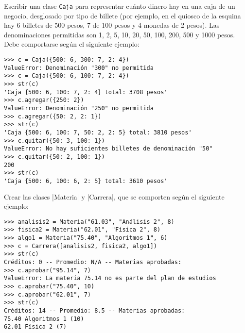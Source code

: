 \begin{ejercicio}
Escribir una clase \lstinline!Caja! para representar cuánto
dinero hay en una caja de un negocio, desglosado por tipo de billete (por
ejemplo, en el quiosco de la esquina hay 6 billetes de 500 pesos, 7 de 100
pesos y 4 monedas de 2 pesos). Las denominaciones permitidas son 1, 2, 5,
10, 20, 50, 100, 200, 500 y 1000 pesos. Debe comportarse según el siguiente ejemplo:

\begin{lstlisting}[numbers=none]
>>> c = Caja({500: 6, 300: 7, 2: 4})
ValueError: Denominación "300" no permitida
>>> c = Caja({500: 6, 100: 7, 2: 4})
>>> str(c)
'Caja {500: 6, 100: 7, 2: 4} total: 3708 pesos'
>>> c.agregar({250: 2})
ValueError: Denominación "250" no permitida
>>> c.agregar({50: 2, 2: 1})
>>> str(c)
'Caja {500: 6, 100: 7, 50: 2, 2: 5} total: 3810 pesos'
>>> c.quitar({50: 3, 100: 1})
ValueError: No hay suficientes billetes de denominación "50"
>>> c.quitar({50: 2, 100: 1})
200
>>> str(c)
'Caja {500: 6, 100: 6, 2: 5} total: 3610 pesos'
\end{lstlisting}
\end{ejercicio}


\begin{ejercicio}
Crear las clases |Materia| y |Carrera|, que se comporten según el siguiente
ejemplo:

\begin{lstlisting}[numbers=none]
>>> analisis2 = Materia("61.03", "Análisis 2", 8)
>>> fisica2 = Materia("62.01", "Física 2", 8)
>>> algo1 = Materia("75.40", "Algoritmos 1", 6)
>>> c = Carrera([analisis2, fisica2, algo1])
>>> str(c)
Créditos: 0 -- Promedio: N/A -- Materias aprobadas:
>>> c.aprobar("95.14", 7)
ValueError: La materia 75.14 no es parte del plan de estudios
>>> c.aprobar("75.40", 10)
>>> c.aprobar("62.01", 7)
>>> str(c)
Créditos: 14 -- Promedio: 8.5 -- Materias aprobadas:
75.40 Algoritmos 1 (10)
62.01 Física 2 (7)
\end{lstlisting}
\end{ejercicio}
